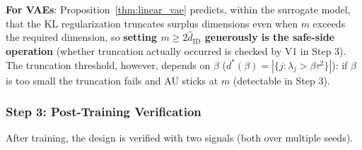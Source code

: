 \documentclass[make,article,submit,pdftex,moreauthors]{Definitions/mdpi}
\newcommand{\hatdID}{\hat{d}_{\mathrm{ID}}}
\newcommand{\dstar}{d^{*}(\beta)}
\begin{document}
\textbf{For VAEs}: Proposition~\ref{thm:linear_vae} predicts, within the
surrogate model, that the KL regularization truncates surplus dimensions
even when $m$ exceeds the required dimension, so
\textbf{setting $m \geq 2\hatdID$ generously is the safe-side operation}
(whether truncation actually occurred is checked by V1 in Step 3).
The truncation threshold, however, depends on $\beta$
($\dstar = |\{j : \lambda_j > \beta\tau^2\}|$): if $\beta$ is too small the
truncation fails and AU sticks at $m$ (detectable in Step 3).

\subsubsection{Step 3: Post-Training Verification}\label{sec:protocol_s3}

After training, the design is verified with two signals (both over multiple
seeds).
\end{document}

